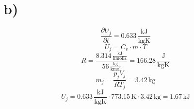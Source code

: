 

\section*{b)}
\[
\frac{\partial U_j}{\partial t} = 0.633 \, \frac{\text{kJ}}{\text{kgK}}
\]
\[
U_j = C_v \cdot m \cdot T
\]
\[
R = \frac{8.314 \, \frac{\text{kJ}}{\text{kmolK}}}{56 \, \frac{\text{kg}}{\text{kmol}}} = 166.28 \, \frac{\text{J}}{\text{kgK}}
\]
\[
m_j = \frac{p_j V_j}{R T_j} = 3.42 \, \text{kg}
\]
\[
U_j = 0.633 \, \frac{\text{kJ}}{\text{kgK}} \cdot 773.15 \, \text{K} \cdot 3.42 \, \text{kg} = 1.67 \, \text{kJ}
\]